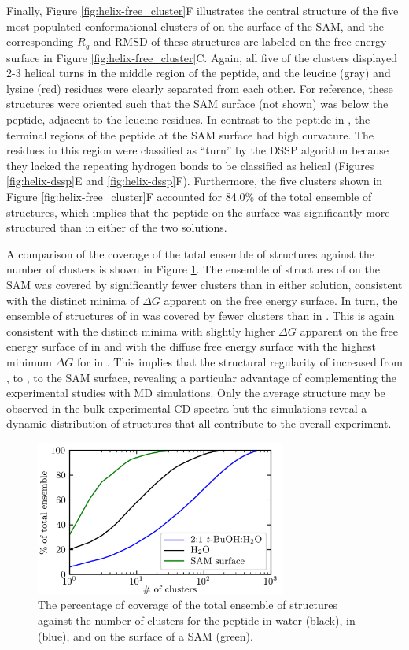 Finally, Figure \ref{fig:helix-free_cluster}F illustrates the central structure of the five most populated conformational clusters of \pep{} on the surface of the SAM, and the corresponding $R_g$ and RMSD of these structures are labeled on the free energy surface in Figure \ref{fig:helix-free_cluster}C. 
Again, all five of the clusters displayed 2-3 helical turns in the middle region of the peptide, and the leucine (gray) and lysine (red) residues were clearly separated from each other. 
For reference, these structures were oriented such that the SAM surface (not shown) was below the peptide, adjacent to the leucine residues. 
In contrast to the peptide in \tbawat{}, the terminal regions of the peptide at the SAM surface had high curvature. 
The residues in this region were classified as ``turn'' by the DSSP algorithm because they lacked the repeating hydrogen bonds to be classified as helical (Figures \ref{fig:helix-dssp}E and \ref{fig:helix-dssp}F). 
Furthermore, the five clusters shown in Figure \ref{fig:helix-free_cluster}F accounted for 84.0\% of the total ensemble of structures, which implies that the peptide on the surface was significantly more structured than in either of the two solutions.

A comparison of the coverage of the total ensemble of structures against the number of clusters is shown in Figure \ref{fig:helix-coverage}. 
The ensemble of structures of \pep{} on the SAM was covered by significantly fewer clusters than \pep{} in either solution, consistent with the distinct minima of $\Delta G$ apparent on the free energy surface. 
In turn, the ensemble of structures of \pep{} in  was covered by fewer clusters than \pep{} in \tbawat{}. 
This is again consistent with the distinct minima with slightly higher $\Delta G$ apparent on the free energy surface of \pep{} in  and with the diffuse free energy surface with the highest minimum $\Delta G$ for \pep{} in \tbawat{}. 
This implies that the structural regularity of \pep{} increased from \tbawat{}, to , to the SAM surface, revealing a particular advantage of complementing the experimental studies with MD simulations. 
Only the average structure may be observed in the bulk experimental CD spectra but the simulations reveal a dynamic distribution of structures that all contribute to the overall experiment. 

\begin{figure}
    \center
    \includegraphics[width=3.25in]{figures-helix/clust-size.png}
    \caption{
        The percentage of coverage of the total ensemble of structures against the number of clusters for the peptide in water (black), in \tbawat{} (blue), and on the surface of a SAM (green).
    }
    \label{fig:helix-coverage}
\end{figure}


